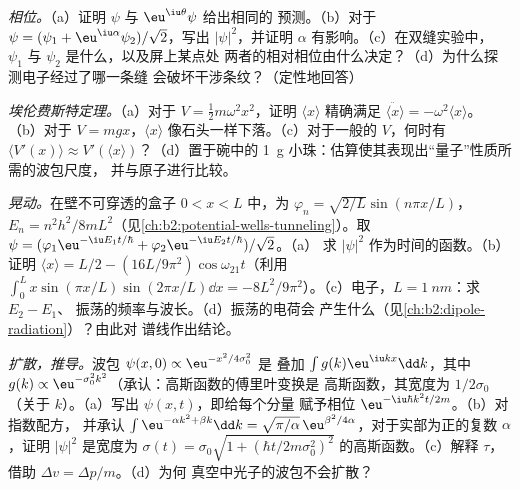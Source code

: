 \begin{exercise}[$\star\star$]\label{exo:b2:schrodinger-wave-functions:8}
\emph{相位。}（a）证明 $\psi$ 与 $\eu^{\iu\theta}\psi$ 给出相同的
预测。（b）对于 $\psi = (\psi_1 + \eu^{\iu\alpha}\psi_2)/\sqrt2$，写出
$|\psi|^2$，并证明 $\alpha$ 有影响。（c）在双缝实验中，
$\psi_1$ 与 $\psi_2$ 是什么，以及屏上某点处
两者的相对相位由什么决定？（d）为什么探测电子经过了哪一条缝
会破坏干涉条纹？（定性地回答）
\end{exercise}

\begin{exercise}[$\star\star$]\label{exo:b2:schrodinger-wave-functions:9}
\emph{埃伦费斯特定理。}（a）对于 $V = \tfrac12m\omega^2x^2$，证明 $\langle
x\rangle$ 精确满足 $\ddot{\langle x\rangle} = -\omega^2\langle x\rangle$。
（b）对于 $V = mgx$，$\langle x\rangle$ 像石头一样下落。（c）对于一般的
$V$，何时有 $\langle V'(x)\rangle \approx V'(\langle x\rangle)$？（d）置于碗中的
\qty{1}{g} 小珠：估算使其表现出“量子”性质所需的波包尺度，
并与原子进行比较。
\end{exercise}

\begin{exercise}[$\star\star\star$]\label{exo:b2:schrodinger-wave-functions:10}
\emph{晃动。}在壁不可穿透的盒子 $0 < x < L$ 中，为
$\varphi_n = \sqrt{2/L}\sin(n\pi x/L)$，$E_n =
n^2h^2/8mL^2$（见\cref{ch:b2:potential-wells-tunneling}）。取 $\psi =
(\varphi_1\eu^{-\iu E_1t/\hbar} + \varphi_2\eu^{-\iu E_2t/\hbar})/\sqrt2$。（a）
求 $|\psi|^2$ 作为时间的函数。（b）证明 $\langle x\rangle = L/2 -
(16L/9\pi^2)\cos\omega_{21}t$（利用 $\int_0^L x\sin(\pi x/L)\sin(2\pi x/L)\dd x
= -8L^2/9\pi^2$）。（c）电子，$L = \qty{1}{nm}$：求 $E_2 - E_1$、
振荡的频率与波长。（d）振荡的电荷会
产生什么（见\cref{ch:b2:dipole-radiation}）？由此对
谱线作出结论。
\end{exercise}

\begin{exercise}[$\star\star\star$]\label{exo:b2:schrodinger-wave-functions:11}
\emph{扩散，推导。}波包 $\psi(x,0) \propto \eu^{-x^2/4\sigma_0^2}$ 是
叠加 $\int g(k)\eu^{\iu kx}\dd k$，其中 $g(k) \propto
\eu^{-\sigma_0^2k^2}$（承认：高斯函数的傅里叶变换是
高斯函数，其宽度为 $1/2\sigma_0$（关于 $k$）。（a）写出 $\psi(x,t)$，即给每个分量
赋予相位 $\eu^{-\iu\hbar k^2t/2m}$。（b）对指数配方，
并承认 $\int\eu^{-\alpha k^2 + \beta k}\dd k = \sqrt{\pi/\alpha}\,
\eu^{\beta^2/4\alpha}$，对于实部为正的复数 $\alpha$，证明
$|\psi|^2$ 是宽度为 $\sigma(t) = \sigma_0\sqrt{1 + (\hbar t/2m
\sigma_0^2)^2}$ 的高斯函数。（c）解释 $\tau$，借助 $\Delta v = \Delta p/m$。（d）为何
真空中光子的波包不会扩散？
\end{exercise}

